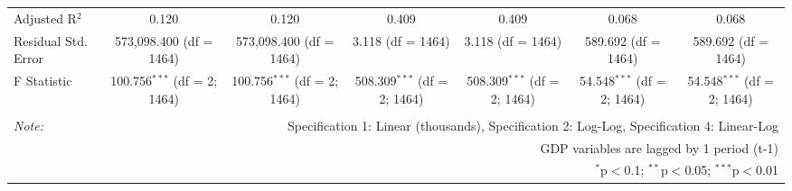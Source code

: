 \begin{table}[!htbp]
\begin{tabular}{@{\extracolsep{5pt}}lcccccc}
Adjusted R$^{2}$ & 0.120 & 0.120 & 0.409 & 0.409 & 0.068 & 0.068 \\
Residual Std. Error & 573,098.400 (df = 1464) & 573,098.400 (df = 1464) & 3.118 (df = 1464) & 3.118 (df = 1464) & 589.692 (df = 1464) & 589.692 (df = 1464) \\
F Statistic & 100.756$^{***}$ (df = 2; 1464) & 100.756$^{***}$ (df = 2; 1464) & 508.309$^{***}$ (df = 2; 1464) & 508.309$^{***}$ (df = 2; 1464) & 54.548$^{***}$ (df = 2; 1464) & 54.548$^{***}$ (df = 2; 1464) \\
\hline
\hline \\[-1.8ex]
\textit{Note:}  & \multicolumn{6}{r}{Specification 1: Linear (thousands), Specification 2: Log-Log, Specification 4: Linear-Log} \\
 & \multicolumn{6}{r}{GDP variables are lagged by 1 period (t-1)} \\
 & \multicolumn{6}{r}{$^{*}$p$<$0.1; $^{**}$p$<$0.05; $^{***}$p$<$0.01} \\
\end{tabular}
\end{table}
